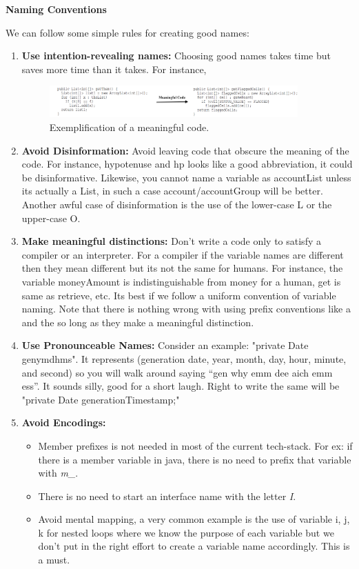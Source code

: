 \documentclass[12pt]{article}
\begin{document}
{\Large \textbf{Naming Conventions}\par}
We can follow some simple rules for creating good names:
\begin{enumerate}
    \item \textbf{Use intention-revealing names: }Choosing good names takes time but saves more time than it takes. For instance,
        \begin{figure}[h]
         \centering
          \includegraphics[width=0.9\textwidth]{CleanCodeImages/CleanCode.png}
         \caption{Exemplification of a meaningful code.}
         \label{fig:screenshot}
        \end{figure}   
        
    \item \textbf{Avoid Disinformation: }Avoid leaving code that obscure the meaning of the code. For instance, hypotenuse and hp looks like a good abbreviation, it could be disinformative. Likewise, you cannot name a variable as accountList unless its actually a List, in such a case account/accountGroup will be better. Another awful case of disinformation is the use of the lower-case L or the upper-case O.
    
    \item \textbf{Make meaningful distinctions:} Don't write a code only to satisfy a compiler or an interpreter. For a compiler if the variable names are different then they mean different but its not the same for humans. For instance, the variable moneyAmount is indistinguishable from money for a human, get is same as retrieve, etc. Its best if we follow a uniform convention of variable naming. Note that there is nothing wrong with using prefix conventions like a and the so long as they make a meaningful distinction.
    
    \item \textbf{Use Pronounceable Names: } Consider an example: "private Date genymdhms". It represents (generation date, year, month, day, hour, minute, and second) so you will walk around saying “gen why emm dee aich emm ess”. It sounds silly, good for a short laugh. Right to write the same will be "private Date generationTimestamp;"
    
    \item \textbf{Avoid Encodings: }
    \begin{itemize}
        \item Member prefixes is not needed in most of the current tech-stack. For ex: if there is a member variable in java, there is no need to prefix that variable with \textit{m_}.
        \item There is no need to start an interface name with the letter \textit{I}.
        \item Avoid mental mapping, a very common example is the use of variable i, j, k for nested loops where we know the purpose of each variable but we don't put in the right effort to create a variable name accordingly. This is a must.


\end{itemize}
\end{enumerate}
\end{document}
